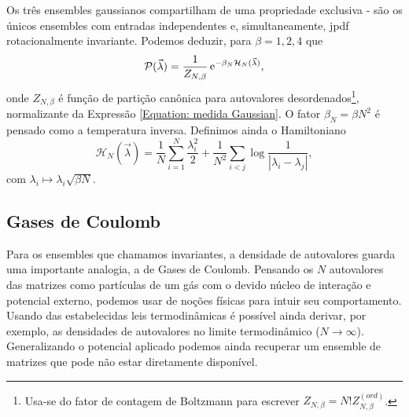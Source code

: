 \documentclass[12pt]{report}
\begin{document}
Os três ensembles gaussianos compartilham de uma propriedade exclusiva - são os únicos ensembles com entradas independentes e, simultaneamente, jpdf rotacionalmente invariante. Podemos deduzir, para $\beta = 1,2,4$ que
\begin{equation}
	\mathcal{P}(\vec{\lambda}) = \frac{1}{Z_{N, \beta}} \operatorname{\rm e}^{-\beta_N \mathcal{H}_N(\vec{\lambda})},
	\label{Equation: medida Gaussian}
\end{equation}
onde $Z_{N, \beta}$ é função de partição canônica para autovalores desordenados\footnote{Usa-se do fator de contagem de Boltzmann para escrever $ Z_{N, \beta} = N! Z_{N, \beta}^{(ord)}$.}, normalizante da Expressão \eqref{Equation: medida Gaussian}. O fator $\beta_N = \beta N^2$ é pensado como a temperatura inversa. Definimos ainda o Hamiltoniano $$\mathcal{H}_N(\vec{\lambda}) = \frac{1}{N}\sum_{i = 1}^{N} \frac{\lambda_i^2}{2} + \frac{1}{N^2} \sum_{i < j} \log{\frac{1}{|\lambda_i - \lambda_j|}},$$ com  $\lambda_i \mapsto \lambda_i \sqrt{\beta N}$.

\subsection{Gases de Coulomb}
\label{Section: Gases de Coulomb}

Para os ensembles que chamamos invariantes, a densidade de autovalores guarda uma importante analogia, a de Gases de Coulomb. Pensando os $N$ autovalores das matrizes como partículas de um gás com o devido núcleo de interação e potencial externo, podemos usar de noções físicas para intuir seu comportamento. Usando das estabelecidas leis termodinâmicas é possível ainda derivar, por exemplo, as densidades de autovalores no limite termodinâmico ($N \rightarrow \infty$). Generalizando o potencial aplicado podemos ainda recuperar um ensemble de matrizes que pode não estar diretamente disponível.

\end{document}
